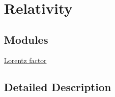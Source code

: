\hypertarget{group___e_g_x_phys-_relativity}{}\section{Relativity}
\label{group___e_g_x_phys-_relativity}
\subsection*{Modules}
\begin{DoxyCompactItemize}
\item 
\hyperlink{group___e_g_x_phys-_lorentz_factor}{Lorentz factor}
\end{DoxyCompactItemize}


\subsection{Detailed Description}
